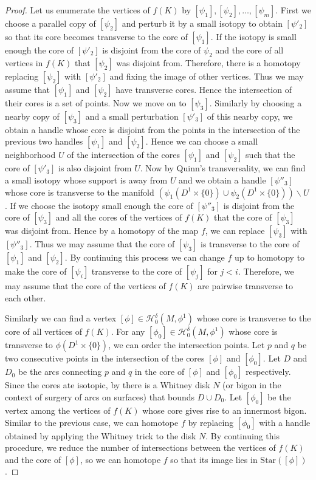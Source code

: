\documentclass[a4paper]{amsart}
\theoremstyle{definition}
\theoremstyle{remark}
\numberwithin{equation}{section}
\begin{document}
\begin{proof}
Let us enumerate   the vertices of $f(K)$ by $[\psi_1], [\psi_2],\dots, [\psi_m]$. First we choose a parallel copy of $[\psi_2]$ and perturb it by a small isotopy to obtain $[\psi'_2]$ so that its core  becomes transverse to the core of $[\psi_1]$. If the isotopy is small enough the core of $[\psi'_2]$ is disjoint from the core of $\psi_2$ and the core of all vertices in $f(K)$ that $[\psi_2]$ was disjoint from. Therefore, there is a homotopy replacing $[\psi_2]$ with $[\psi'_2]$ and fixing the image of other vertices. Thus we may assume that $[\psi_1]$ and $[\psi_2]$ have transverse cores.  Hence the intersection of their cores is a set of points. Now we move on to $[\psi_3]$. Similarly by choosing a nearby copy of $[\psi_3]$ and a small perturbation $[\psi'_3]$ of this nearby copy, we obtain a handle whose core is disjoint from the points in the intersection of the previous two handles $[\psi_1]$ and $[\psi_2]$.  Hence we can choose a small neighborhood $U$ of the intersection of the cores $[\psi_1]$ and $[\psi_2]$ such that the core of $[\psi'_3]$ is also disjoint from $U$. Now by Quinn's transversality, we can find a small isotopy whose support is away from $U$ and we obtain a handle $[\psi''_3]$ whose core is transverse to the manifold $(\psi_1(D^1\times \{0\})\cup \psi_2(D^1\times \{0\}))\backslash U$. If we choose the isotopy small enough the core of $[\psi''_3]$ is disjoint from the core of $[\psi_3]$ and all the cores of the vertices of $f(K)$ that the core of $[\psi_3]$ was disjoint from. Hence by a homotopy of the map $f$, we can replace $[\psi_3]$ with $[\psi''_3]$. Thus we may assume that the core of $[\psi_3]$ is transverse to the core of $[\psi_1]$ and $[\psi_2]$. By continuing this process we can change $f$ up to homotopy to make the core of $[\psi_i]$ transverse to the core of $[\psi_j]$ for $j<i$. Therefore, we may assume that the core of the vertices of $f(K)$ are pairwise transverse to each other.

Similarly we can find a vertex $[\phi]\in \mathcal{H}_{0}^{\delta}(M,\phi^1)$ whose core is transverse to the core of all vertices of $f(K)$. For any $[\phi_0]\in \mathcal{H}_{0}^{\delta}(M,\phi^1)$ whose core is transverse to $\phi(D^1\times \{0\})$, we can order the intersection points. Let $p$ and $q$ be two consecutive points in the intersection of the cores $[\phi]$ and $[\phi_0]$. Let $D$ and $D_0$ be the arcs connecting $p$ and $q$ in the core of $[\phi]$ and $[\phi_0]$ respectively. Since the cores ate isotopic, by \cite[Proposition 1.7]{farb2011primer} there is a Whitney disk $N$ (or bigon in the context of surgery of arcs on surfaces) that bounds $D\cup D_0$. Let $[\phi_0]$  be the vertex among the vertices of $f(K)$ whose core  gives rise to an innermost bigon. Similar to the previous case, we can homotope $f$ by replacing $[\phi_0]$ with a handle obtained by applying the Whitney trick to the disk $N$. By continuing this procedure, we reduce the number of intersections between the vertices of $f(K)$ and the core of $[\phi]$, so we can homotope $f$ so that its image lies in $\text{Star}([\phi])$.
\end{proof}
\end{document}
